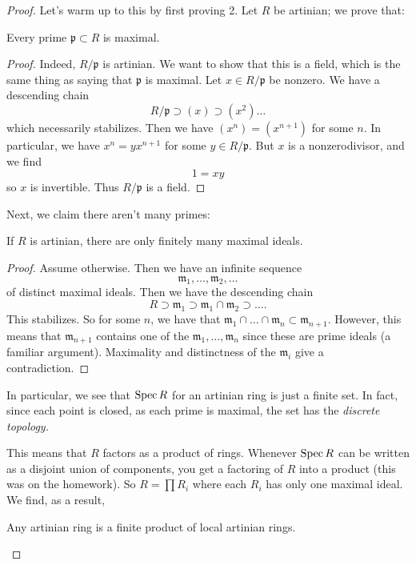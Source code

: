 \begin{proof} 
Let's warm up to this by first proving 2. Let $R$ be artinian; we prove that:

\begin{lemma} 
Every prime $\mathfrak{p} \subset R$ is maximal.
\end{lemma} 
\begin{proof} 
Indeed, $R/\mathfrak{p}$ is artinian. We want to show that this is a field,
which is the same thing as saying that $\mathfrak{p}$ is maximal. Let $x \in
R/\mathfrak{p}$ be nonzero. We have a descending chain
\[ R/\mathfrak{p} \supset (x) \supset (x^{2}) \dots  \]
which necessarily stabilizes. Then we have $(x^n) = (x^{n+1})$ for some $n$. In
particular, we have $x^n = y x^{n+1}$ for some $y \in R/\mathfrak{p}$. But $x$
is a nonzerodivisor, and  we find $$ 1 = xy$$ so $x$ is invertible. Thus
$R/\mathfrak{p}$ is a field.
\end{proof} 

Next, we claim there aren't many primes:
\begin{lemma} 
If $R$ is artinian, there are only finitely many maximal ideals.
\end{lemma} 
\begin{proof} 
Assume otherwise. Then we have an infinite sequence
\[ \mathfrak{m}_1, \dots, \mathfrak{m}_2, \dots  \]
of distinct maximal ideals. Then we have the descending chain
\[ R \supset \mathfrak{m}_1 \supset \mathfrak{m}_1 \cap \mathfrak{m}_2 \supset \dots.  \]
This stabilizes. So for some $n$, we have that $\mathfrak{m}_1 \cap \dots \cap 
\mathfrak{m}_n \subset \mathfrak{m}_{n+1}$. However, this means that
$\mathfrak{m}_{n+1}$ contains one of the $\mathfrak{m}_1, \dots,
\mathfrak{m}_n$ since these are prime ideals (a familiar argument).  Maximality
and distinctness of the $\mathfrak{m}_i$ give a contradiction.
\end{proof} 

In particular, we see that $\operatorname{Spec} R$ for an artinian ring is just a finite set.
In fact, since each point is closed, as each prime is maximal, the set has the
\emph{discrete topology.}

This means that $R$ factors as a product of rings. Whenever $\operatorname{Spec} R$ can be
written as a disjoint union of components, you get a factoring of $R$ into a
product (this was on the homework). So $R = \prod R_i$ where each $R_i$ has
only one maximal ideal. We find, as a result, 
\begin{proposition} 
Any artinian ring is a finite product of local artinian rings.
\end{proposition} 


\end{proof}
